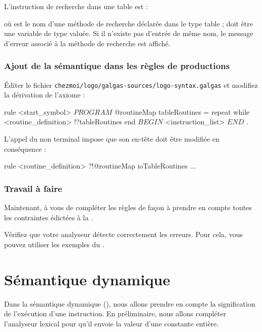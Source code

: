 L'instruction de recherche dans une table est :
\begin{galgascode}
\end{galgascode}
où  est le nom d'une méthode de recherche déclarée dans le type table ;  doit être une variable de type  valuée. Si il n'existe pas d'entrée de même nom, le message d'erreur associé à la méthode de recherche est affiché.

\subsubsection{Ajout de la sémantique dans les règles de productions}
Éditer le fichier \texttt{chezmoi/logo/galgas-sources/logo-syntax.galgas} et modifiez la dérivation de l'axiome :

\begin{galgascode}
rule <start_symbol> {
  $PROGRAM$
  @routineMap tableRoutines = {}
  repeat
  while 
    <routine_definition> !?tableRoutines
  end
  $BEGIN$
  <instruction_list>
  $END$
  $.$
}
\end{galgascode}

L'appel du non terminal impose que son en-tête doit être modifiée en conséquence :
\begin{galgascode}
rule <routine_definition> ?!@routineMap ioTableRoutines {
  ...
}
\end{galgascode}

\subsubsection{Travail à faire}
Maintenant, à vous de compléter les règles de façon à prendre en compte toutes les contraintes édictées à la .

Vérifiez que votre analyseur détecte correctement les erreurs. Pour cela, vous pouvez utiliser les exemples du .




\section{Sémantique dynamique}

Dans la sémantique dynamique (), nous allons prendre en compte la signification de l'exécution d'une instruction. En préliminaire, nous allons compléter l'analyseur lexical pour qu'il envoie la valeur d'une constante entière.

